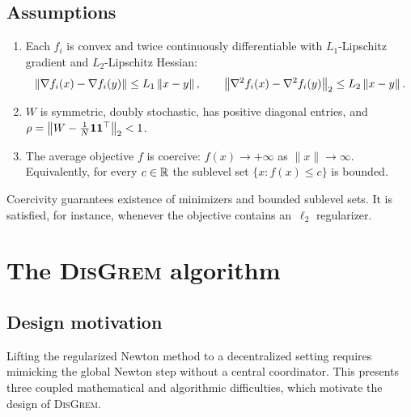 \documentclass[review,onefignum,onetabnum]{siamart171218}
\begin{document}
	\subsection{Assumptions}
	\begin{assumption}\label{ass:problem}
		\leavevmode\par\nopagebreak\vspace{-0.6\baselineskip}
		\begin{enumerate}[label=(\roman*),leftmargin=2em,itemsep=4pt,topsep=4pt]
			\item Each $f_i$ is convex and twice continuously differentiable
			with $L_1$-Lipschitz gradient and $L_2$-Lipschitz Hessian:
			\[
			\left\|\nabla f_i(x)-\nabla f_i(y)\right\|\le L_1\left\|x-y\right\|,
			\qquad
			\left\|\nabla^2 f_i(x)-\nabla^2 f_i(y)\right\|_2\le L_2\left\|x-y\right\|.
			\]
			\item $W$ is symmetric, doubly stochastic, has positive diagonal
			entries, and $\rho=\left\|W-\frac{1}{N}\mathbf{1}\mathbf{1}^\top\right\|_2<1$.
			\item The average objective $f$ is coercive: $f(x)\to+\infty$ as $\|x\|\to\infty$.
			Equivalently, for every $c\in\mathbb{R}$ the sublevel set $\{x:f(x)\le c\}$ is bounded.
		\end{enumerate}
	\end{assumption}
	
	\begin{remark}\label{rem:coercivity}
		Coercivity guarantees existence of minimizers and bounded sublevel
		sets. It is satisfied, for instance, whenever the objective contains
		an~$\ell_2$ regularizer.
	\end{remark}
	
	
	\section{The \textsc{DisGrem} algorithm}\label{sec:alg}
	
	\subsection{Design motivation}\label{ssec:design}
	
	Lifting the regularized Newton method to a decentralized setting
	requires mimicking the global Newton step without a central
	coordinator.
	This presents three coupled mathematical and algorithmic
	difficulties, which motivate the design of \textsc{DisGrem}.
	
\end{document}
